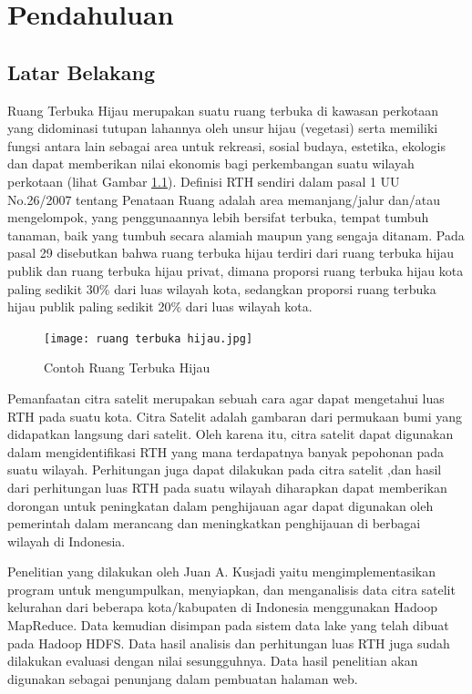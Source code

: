 \chapter{Pendahuluan}
\label{chap:intro}

\section{Latar Belakang}
\label{sec:label}

Ruang Terbuka Hijau merupakan suatu ruang terbuka di kawasan perkotaan yang didominasi tutupan lahannya oleh unsur hijau (vegetasi) serta memiliki fungsi antara lain sebagai area untuk rekreasi, sosial budaya, estetika, ekologis dan dapat memberikan nilai ekonomis bagi perkembangan suatu wilayah perkotaan (lihat Gambar \ref{fig:rth}). Definisi RTH sendiri dalam pasal 1 UU No.26/2007 tentang Penataan Ruang adalah area memanjang/jalur dan/atau mengelompok, yang penggunaannya lebih bersifat terbuka, tempat tumbuh tanaman, baik yang tumbuh secara alamiah maupun yang sengaja ditanam. Pada pasal 29 disebutkan bahwa ruang terbuka hijau terdiri dari ruang terbuka hijau publik dan ruang terbuka hijau privat, dimana proporsi ruang terbuka hijau kota paling sedikit 30\% dari luas wilayah kota, sedangkan proporsi ruang terbuka hijau publik paling sedikit 20\% dari luas wilayah kota. %

\begin{figure}[h]
	\centering
	\texttt{[image: ruang terbuka hijau.jpg]}
	\caption[RTH]{Contoh Ruang Terbuka Hijau\protect\footnotemark}
	\label{fig:rth}
\end{figure}


Pemanfaatan citra satelit merupakan sebuah cara agar dapat mengetahui luas RTH pada suatu kota. Citra Satelit adalah gambaran dari permukaan bumi yang didapatkan langsung dari satelit. Oleh karena itu, citra satelit dapat digunakan dalam mengidentifikasi RTH yang mana terdapatnya banyak pepohonan pada suatu wilayah. Perhitungan juga dapat dilakukan pada citra satelit ,dan hasil dari perhitungan luas RTH pada suatu wilayah diharapkan dapat memberikan dorongan untuk peningkatan dalam penghijauan agar dapat digunakan oleh pemerintah dalam merancang dan meningkatkan penghijauan di berbagai wilayah di Indonesia.

Penelitian yang dilakukan oleh Juan A. Kusjadi yaitu mengimplementasikan program untuk mengumpulkan, menyiapkan, dan menganalisis data
citra satelit kelurahan dari beberapa kota/kabupaten di Indonesia menggunakan Hadoop MapReduce. Data kemudian disimpan pada sistem data lake yang telah dibuat pada Hadoop HDFS. Data hasil analisis dan perhitungan luas RTH juga sudah dilakukan evaluasi dengan nilai sesungguhnya\cite{juan:22:pengumpulan}. Data hasil penelitian akan digunakan sebagai penunjang dalam pembuatan halaman web. 

